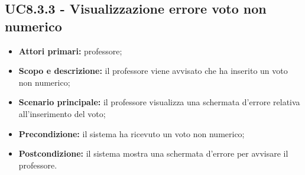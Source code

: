 \documentclass[AnalisiDeiRequisiti.tex]{subfiles}
\begin{document}
\subsection{UC8.3.3 - Visualizzazione errore voto non numerico}
\begin{itemize}
	\item \textbf{Attori primari:} professore;
	\item \textbf{Scopo e descrizione:} il professore viene avvisato che ha inserito un voto non numerico;
	\item \textbf{Scenario principale:} il professore visualizza una schermata d'errore relativa all'inserimento del voto;
	\item \textbf{Precondizione:} il sistema ha ricevuto un voto non numerico; 
	\item \textbf{Postcondizione:} il sistema mostra una schermata d'errore per avvisare il professore.
\end{itemize}
\end{document}
